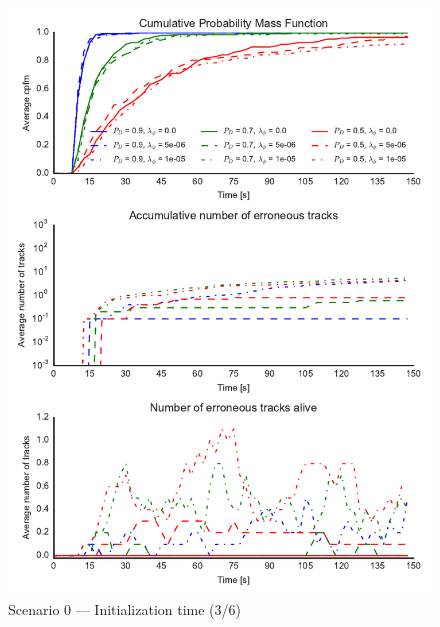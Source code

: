 \begin{figure}
\centering
\includegraphics{Figures/plots/Scenario0_Init-Time(3-6).pdf}
\caption{Scenario 0 --- Initialization time (3/6)}\label{fig:init0_time_3-6}
\end{figure}